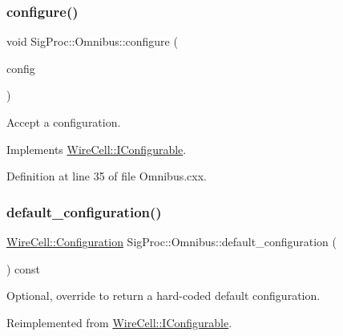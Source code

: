 \subsubsection{\texorpdfstring{configure()}{configure()}}
{\footnotesize\ttfamily void Sig\+Proc\+::\+Omnibus\+::configure (\begin{DoxyParamCaption}\item[{const \hyperlink{namespace_wire_cell_a9f705541fc1d46c608b3d32c182333ee}{Wire\+Cell\+::\+Configuration} \&}]{config }\end{DoxyParamCaption})\hspace{0.3cm}{\ttfamily [virtual]}}



Accept a configuration. 



Implements \hyperlink{class_wire_cell_1_1_i_configurable_a57ff687923a724093df3de59c6ff237d}{Wire\+Cell\+::\+I\+Configurable}.



Definition at line 35 of file Omnibus.\+cxx.

\mbox{\label{class_wire_cell_1_1_sig_proc_1_1_omnibus_a6b55ae0abaf191124c0f778f72f90553}} 
\subsubsection{\texorpdfstring{default\+\_\+configuration()}{default\_configuration()}}
{\footnotesize\ttfamily \hyperlink{namespace_wire_cell_a9f705541fc1d46c608b3d32c182333ee}{Wire\+Cell\+::\+Configuration} Sig\+Proc\+::\+Omnibus\+::default\+\_\+configuration (\begin{DoxyParamCaption}{ }\end{DoxyParamCaption}) const\hspace{0.3cm}{\ttfamily [virtual]}}



Optional, override to return a hard-\/coded default configuration. 



Reimplemented from \hyperlink{class_wire_cell_1_1_i_configurable_a54841b2da3d1ea02189478bff96f7998}{Wire\+Cell\+::\+I\+Configurable}.



